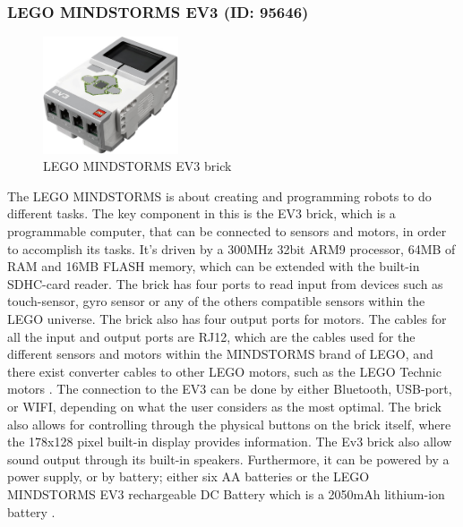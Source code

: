\subsubsection{LEGO MINDSTORMS EV3 (ID: 95646)}
\begin{figure}[H]
  \centering
  \includegraphics[width=4cm]{images/techAnalysis/LegoEV3.jpg}
  \caption{LEGO MINDSTORMS EV3 brick \cite{BrickOWl-figure-EV3}}\label{fig:sssec:LEGOEV3-EV3}
\end{figure}
The LEGO MINDSTORMS is about creating and programming robots to do different tasks.
The key component in this is the EV3 brick, which is a programmable computer, that can be connected to sensors and motors, in order to accomplish its tasks.
It's driven by a 300MHz 32bit ARM9 processor, 64MB of RAM and 16MB FLASH memory, which can be extended with the built-in SDHC-card reader.
The brick has four ports to read input from devices such as touch-sensor, gyro sensor or any of the others compatible sensors within the LEGO universe.
The brick also has four output ports for motors.
The cables for all the input and output ports are RJ12, which are the cables used for the different sensors and motors within the MINDSTORMS brand of LEGO, and there exist converter cables to other LEGO motors, such as the LEGO Technic motors \cite{LEGO_ev3_nodate}.
The connection to the EV3 can be done by either Bluetooth, USB-port, or WIFI, depending on what the user considers as the most optimal.
The brick also allows for controlling through the physical buttons on the brick itself, where the 178x128 pixel built-in display provides information.
The Ev3 brick also allow sound output through its built-in speakers.
Furthermore, it can be powered by a power supply, or by battery; either six AA batteries or the LEGO MINDSTORMS EV3 rechargeable DC Battery which is a 2050mAh lithium-ion battery \cite{LEGO_lego_nodate2}. \cite{LEGO_mindstorms_2013-1} \cite{LEGO_lego_nodate}
